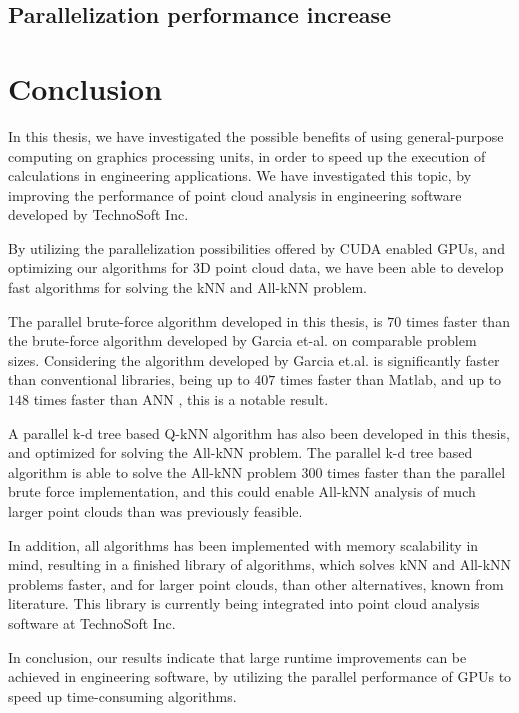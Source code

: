 \subsection{Parallelization performance increase} %
\label{sub:parallelization_performance_increase}
 

\clearpage

\section{Conclusion} %
\label{sec:conclusion}

In this thesis, we have investigated the possible benefits of using general-purpose computing on graphics processing units, in order to speed up the execution of calculations in engineering applications. We have investigated this topic, by improving the performance of point cloud analysis in engineering software developed by TechnoSoft Inc.

By utilizing the parallelization possibilities offered by CUDA enabled GPUs, and optimizing our algorithms for 3D point cloud data, we have been able to develop fast algorithms for solving the kNN and All-kNN problem.

The parallel brute-force algorithm developed in this thesis, is $70$ times faster than the brute-force algorithm developed by Garcia et-al. \cite{Garcia2008} on comparable problem sizes. Considering the algorithm developed by Garcia et.al. is significantly faster than conventional libraries, being up to $407$ times faster than Matlab, and up to $148$ times faster than ANN \citep[Table 1]{Garcia2008}, this is a notable result.

A parallel k-d tree based Q-kNN algorithm has also been developed in this thesis, and optimized for solving the All-kNN problem. The parallel k-d tree based algorithm is able to solve the All-kNN problem $300$ times faster than the parallel brute force implementation, and this could enable All-kNN analysis of much larger point clouds than was previously feasible.

In addition, all algorithms has been implemented with memory scalability in mind, resulting in a finished library of algorithms, which solves kNN and All-kNN problems faster, and for larger point clouds, than other alternatives, known from literature. This library is currently being integrated into point cloud analysis software at TechnoSoft Inc.

In conclusion, our results indicate that large runtime improvements can be achieved in engineering software, by utilizing the parallel performance of GPUs to speed up time-consuming algorithms.
